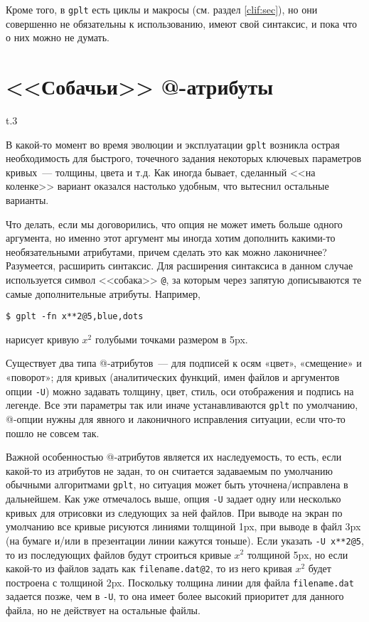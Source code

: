 \documentclass[12pt]{article}
\def\gplt{{\tt gplt}}
\begin{document}
Кроме того, в \gplt{} есть циклы и макросы (см. раздел \ref{clif:sec}), но они совершенно не обязательны к использованию, имеют свой синтаксис, и пока что
о них можно не думать.


\section{<<Собачьи>> @-атрибуты}\label{dog:attr:sec}
\begin{wrapfigure}[5]{t}{.3\textwidth}
  \vphantom{.}
  \vspace{-2.5cm}

\end{wrapfigure}
В какой-то момент во время эволюции и эксплуатации \verb'gplt' возникла острая необходимость для быстрого, точечного задания некоторых ключевых
параметров кривых~--- толщины, цвета и т.д. Как иногда бывает, сделанный <<на коленке>> вариант
оказался настолько удобным, что вытеснил остальные варианты. 

Что делать, если мы договорились, что опция не может иметь больше одного аргумента, но именно этот аргумент мы иногда хотим дополнить какими-то необязательными атрибутами,
причем сделать это как можно лаконичнее?
Разумеется, расширить синтаксис. Для расширения синтаксиса в данном случае используется символ <<собака>> \verb'@', за которым через запятую дописываются те самые
дополнительные атрибуты. Например,
\begin{verbatim}
$ gplt -fn x**2@5,blue,dots
\end{verbatim}
нарисует кривую $x^2$ голубыми точками размером в 5px.

Существует два типа @-атрибутов~--- для подписей к осям «цвет», «смещение» и «поворот»; для кривых (аналитических функций,
имен файлов и аргументов опции \verb'-U') можно задавать толщину, цвет, стиль, оси отображения и подпись на легенде.
Все эти параметры так или иначе устанавливаются \gplt{} по умолчанию, @-опции нужны для явного и лаконичного исправления ситуации, если что-то пошло не совсем так. 

Важной особенностью @-атрибутов является их наследуемость, то есть, если какой-то из атрибутов не задан, то он считается задаваемым по умолчанию
обычными алгоритмами \gplt, но ситуация может быть уточнена/исправлена в дальнейшем.
Как уже отмечалось выше, опция \verb'-U' задает одну или несколько кривых для отрисовки из следующих за ней файлов. При выводе на экран по умолчанию
все кривые рисуются линиями толщиной 1px, при выводе в файл 3px (на бумаге и/или в презентации линии кажутся тоньше).
Если указать \verb'-U x**2@5', то из последующих файлов будут строиться кривые $x^2$ толщиной 5px, но если какой-то из файлов задать как
\verb'filename.dat@2', то из него кривая $x^2$ будет построена с толщиной 2px. Поскольку толщина линии для файла \verb'filename.dat' задается позже, чем в \verb'-U',
то она имеет более высокий приоритет для данного файла, но не действует на остальные файлы. 
\end{document}
